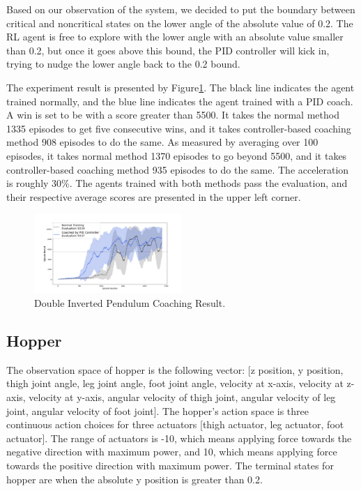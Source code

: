 \documentclass[journal]{IEEEtran}
\begin{document}
Based on our observation of the system, we decided to put the boundary between critical and noncritical states on the lower angle of the absolute value of 0.2. The RL agent is free to explore with the lower angle with an absolute value smaller than 0.2, but once it goes above this bound, the PID controller will kick in, trying to nudge the lower angle back to the 0.2 bound.



The experiment result is presented by Figure\ref{fig:double_result}. The black line indicates the agent trained normally, and the blue line indicates the agent trained with a PID coach. A win is set to be with a score greater than 5500. It takes the normal method 1335 episodes to get five consecutive wins, and it takes controller-based coaching method 908 episodes to do the same. As measured by averaging over 100 episodes, it takes normal method 1370 episodes to go beyond 5500, and it takes controller-based coaching method 935 episodes to do the same. The acceleration is roughly 30\%. The agents trained with both methods pass the evaluation, and their respective average scores are presented in the upper left corner.

\begin{figure}
     \centering
      \includegraphics[width=0.5\textwidth]{double.png}
      \caption{Double Inverted Pendulum Coaching Result.}
      \label{fig:double_result}
\end{figure}



\subsection{Hopper}
The observation space of hopper is the following vector: [z position, y position, thigh joint angle, leg joint angle, foot joint angle, velocity at x-axis, velocity at z-axis, velocity at y-axis, angular velocity of thigh joint, angular velocity of leg joint, angular velocity of foot joint]. The hopper's action space is three continuous action choices for three actuators [thigh actuator, leg actuator, foot actuator]. The range of actuators is -10, which means applying force towards the negative direction with maximum power, and 10, which means applying force towards the positive direction with maximum power. The terminal states for hopper are when the absolute y position is greater than 0.2.
\end{document}
